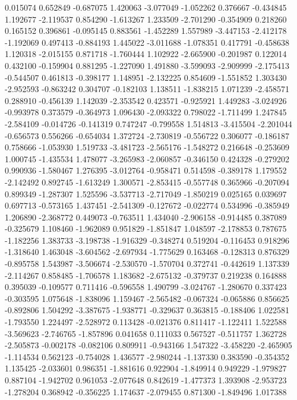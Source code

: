 0.015074
0.652849
-0.687075
1.420063
-3.077049
-1.052262
0.376667
-0.434845
1.192677
-2.119537
0.854290
-1.613267
1.233509
-2.701290
-0.354909
0.218260
0.165152
0.396861
-0.095145
0.883561
-1.452289
1.557989
-3.447153
-2.412178
-1.192069
0.497413
-0.884193
1.445022
-3.011688
-1.078351
0.417791
-0.458638
1.120318
-2.015155
0.871718
-1.760444
1.102922
-2.665900
-0.201987
0.122014
0.432100
-0.159904
0.881295
-1.227090
1.491880
-3.599093
-2.909999
-2.175413
-0.544507
0.461813
-0.398177
1.148951
-2.132225
0.854609
-1.551852
1.303430
-2.952593
-0.863242
0.304707
-0.182103
1.138511
-1.838215
1.071239
-2.458571
0.288910
-0.456139
1.142039
-2.353542
0.423571
-0.925921
1.449283
-3.024926
-0.993978
0.373579
-0.364973
1.096430
-2.093322
0.798022
-1.711499
1.247845
-2.584109
-0.014726
-0.141319
0.747247
-0.799558
1.514813
-3.415504
-2.201044
-0.656573
0.556266
-0.654034
1.372724
-2.730819
-0.556722
0.306077
-0.186187
0.758666
-1.053930
1.519733
-3.481723
-2.565176
-1.548272
0.216648
-0.253609
1.000745
-1.435534
1.478077
-3.265983
-2.060857
-0.346150
0.424328
-0.279202
0.990936
-1.580467
1.276395
-3.012764
-0.958471
0.514598
-0.389178
1.179552
-2.142492
0.892745
-1.613249
1.300571
-2.853415
-0.557748
0.365966
-0.207094
0.899349
-1.287307
1.525596
-3.537713
-2.717049
-1.850219
0.025165
0.039697
0.697713
-0.573165
1.437451
-2.541309
-0.127672
-0.022774
0.534996
-0.385949
1.206890
-2.368772
0.449073
-0.763511
1.434040
-2.906158
-0.914485
0.387089
-0.325679
1.108460
-1.962089
0.951829
-1.851847
1.048597
-2.178853
0.787675
-1.182256
1.383733
-3.198738
-1.916329
-0.348274
0.519204
-0.116453
0.918296
-1.318640
1.463048
-3.604562
-2.697934
-1.775629
0.163468
-0.128313
0.876329
-0.895758
1.543987
-3.506674
-2.530570
-1.570704
0.372741
-0.442619
1.137339
-2.114267
0.858485
-1.706578
1.183682
-2.675132
-0.379737
0.219238
0.164888
0.395039
-0.109577
0.711416
-0.596558
1.490799
-3.024767
-1.280670
0.337423
-0.303595
1.075648
-1.838096
1.159467
-2.565482
-0.067324
-0.065886
0.856625
-0.892806
1.504292
-3.387675
-1.938771
-0.329637
0.363815
-0.188406
1.022581
-1.793550
1.224497
-2.528972
0.113428
-0.021376
0.811417
-1.122411
1.522588
-3.569623
-2.746765
-1.857896
0.041658
0.111033
0.567527
-0.511757
1.362728
-2.505873
-0.002178
-0.082106
0.809911
-0.943166
1.547322
-3.458220
-2.465905
-1.114534
0.562123
-0.754028
1.436577
-2.980244
-1.137330
0.383590
-0.354352
1.135425
-2.033601
0.986351
-1.881616
0.922904
-1.849914
0.949229
-1.979827
0.887104
-1.942702
0.961053
-2.077648
0.842619
-1.477373
1.393908
-2.953723
-1.278204
0.368942
-0.356225
1.174637
-2.079455
0.871300
-1.849496
1.017388
